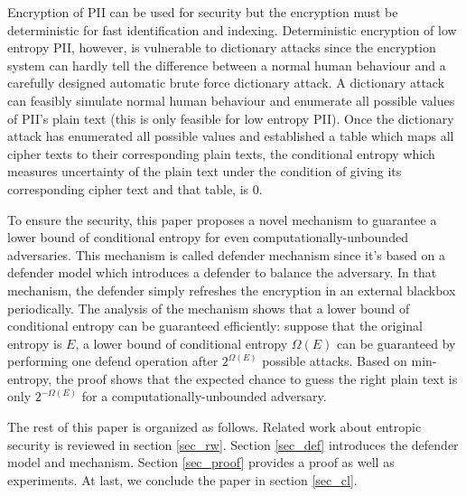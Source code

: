 \documentclass[10pt, conference, compsocconf]{IEEEtran}
\begin{document}
    Encryption of PII can be used for security but
    the encryption must be deterministic for fast identification and indexing.
    Deterministic encryption of low entropy PII, however, is
    vulnerable to dictionary attacks since the encryption system can hardly tell
    the difference between a normal human behaviour and a carefully
    designed automatic brute force dictionary attack. A dictionary
    attack can feasibly simulate normal human behaviour and enumerate all
    possible values of PII's plain text (this is only feasible for low entropy PII).
    Once the dictionary attack has enumerated all possible values
    and established a table which maps all cipher texts
    to their corresponding plain texts, the conditional entropy \cite{math_book, info_measure}
    which measures uncertainty of the plain text under the condition of giving
    its corresponding cipher text and that table, is $0$.

    To ensure the security,
    this paper proposes a novel mechanism to guarantee a
    lower bound of conditional entropy for even computationally-unbounded
    adversaries. This mechanism is called defender mechanism
    since it's based on a defender model which introduces
    a defender to balance the adversary.
    In that mechanism, the defender simply refreshes
    the encryption in an external blackbox periodically.
    The analysis of the mechanism shows that a lower bound
    of conditional entropy can be guaranteed efficiently: suppose that the original entropy
    is $E$, a lower bound of conditional entropy $\Omega(E)$ can be guaranteed
    by performing one defend operation after $2^{\Omega(E)}$
    possible attacks. Based on min-entropy, the proof shows that
    the expected chance to guess the right plain text is only $2^{-\Omega(E)}$ for
    a computationally-unbounded adversary.


    The rest of this paper is organized as follows.
    Related work about entropic security
    is reviewed in section \ref{sec_rw}.
    Section \ref{sec_def} introduces the defender model and mechanism.
    Section \ref{sec_proof} provides a proof as well as experiments.
    At last, we conclude the paper in section \ref{sec_cl}.
\end{document}
